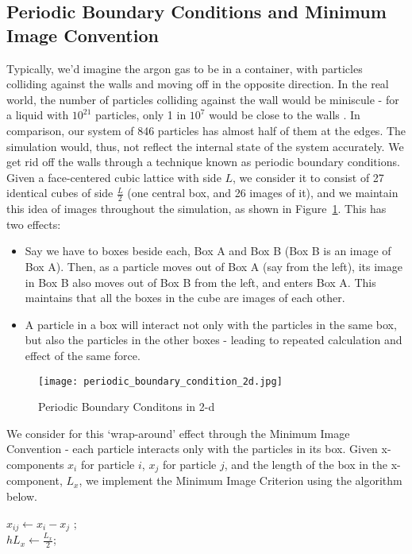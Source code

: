 \documentclass[../Main.tex]{subfiles}
\begin{document}
\subsection{Periodic Boundary Conditions and Minimum Image Convention}
Typically, we'd imagine the argon gas to be in a container, with particles colliding against the walls and moving off in the opposite direction. In the real world, the number of particles colliding against the wall would be miniscule - for a liquid with $10^{21}$ particles, only 1 in $10^{7}$ would be close to the walls \cite{Rapaport2004}. In comparison, our system of 846 particles has almost half of them at the edges. The simulation would, thus, not reflect the internal state of the system accurately. We get rid off the walls through a technique known as periodic boundary conditions.
Given a face-centered cubic lattice with side $L$, we consider it to consist of 27 identical cubes of side $\frac{L}{2}$ (one central box, and 26 images of it), and we maintain this idea of images throughout the simulation, as shown in Figure~\ref{periodic_boundary_condition_2d}. This has two effects: 
	\begin{itemize}
	\item
	Say we have to boxes beside each, Box A and Box B (Box B is an image of Box A). Then, as a particle moves out of Box A (say from the left), its image in Box B also moves out of Box B from the left, and enters Box A. This maintains that all the boxes in the cube are images of each other.
	\item
	A particle in a box will interact not only with the particles in the same box, but also the particles in the other boxes - leading to repeated calculation and effect of the same force.
	\end{itemize}

\begin{figure}[t]
\centering
	\texttt{[image: periodic\_boundary\_condition\_2d.jpg]}
  	\caption{Periodic Boundary Conditons in 2-d}
	\label{periodic_boundary_condition_2d}
\end{figure}

We consider for this `wrap-around' effect through the Minimum Image Convention - each particle interacts only with the particles in its box. Given x-components $x_{i}$ for particle $i$, $x_{j}$ for particle $j$, and the length of the box in the x-component, $L_{x}$, we implement the Minimum Image Criterion using the algorithm below.

\begin{algorithm}[H]
\SetAlgoLined
{}

\BlankLine

$x_{ij} \leftarrow x_{i} - x_{j}$ ;\\
$hL_{x} \leftarrow \frac{L_{x}}{2}$; \\
\caption{Minimum Image Convention in 1-d}
\label{algorithm:minimum_image_convention}
\end{algorithm}
\end{document}
